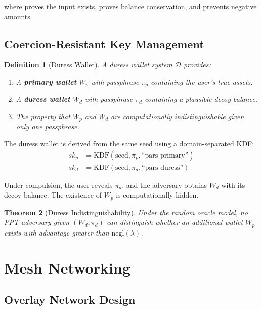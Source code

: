 \documentclass[11pt,a4paper,twocolumn]{article}
\newtheorem{theorem}{Theorem}[section]
\newtheorem{definition}[theorem]{Definition}
\begin{document}
where  proves the input exists,  proves balance conservation, and  prevents negative amounts.

\subsection{Coercion-Resistant Key Management}

\begin{definition}[Duress Wallet]
A duress wallet system $\mathcal{D}$ provides:
\begin{enumerate}
  \item A \textbf{primary wallet} $W_p$ with passphrase $\pi_p$ containing the user's true assets.
  \item A \textbf{duress wallet} $W_d$ with passphrase $\pi_d$ containing a plausible decoy balance.
  \item The property that $W_p$ and $W_d$ are computationally indistinguishable given only one passphrase.
\end{enumerate}
\end{definition}

The duress wallet is derived from the same seed using a domain-separated KDF:
\begin{align}
  sk_p &= \text{KDF}(\text{seed}, \pi_p, \text{``pars-primary''}) \\
  sk_d &= \text{KDF}(\text{seed}, \pi_d, \text{``pars-duress''})
\end{align}

Under compulsion, the user reveals $\pi_d$, and the adversary obtains $W_d$ with its decoy balance. The existence of $W_p$ is computationally hidden.

\begin{theorem}[Duress Indistinguishability]
Under the random oracle model, no PPT adversary given $(W_d, \pi_d)$ can distinguish whether an additional wallet $W_p$ exists with advantage greater than $\text{negl}(\lambda)$.
\end{theorem}

\section{Mesh Networking}
\label{sec:mesh}

\subsection{Overlay Network Design}
\end{document}
